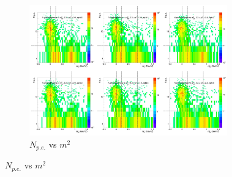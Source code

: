 \begin{figure}[H]
  \centering
    \begin{subfigure}{1\textwidth}
   \centering
   \includegraphics[width=0.94\textwidth]{hiptfits/neg/PSaccthreshold_cent0_ich0_accfire0_ptbin9.jpg}
    \caption{$N_{p.e.}$ vs $m^2$}
    \end{subfigure}
\end{figure}
